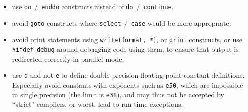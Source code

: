\begin{itemize}
\item use \texttt{do}~/~\texttt{enddo} constructs instead of
      \texttt{do}~/~\texttt{continue}.

\item avoid \texttt{goto} constructs where \texttt{select}~/~\texttt{case}
      would be more appropriate.

\item avoid print statements using \texttt{write(format, *)},
      or \texttt{print} constructs, or use \texttt{\#ifdef debug}
      around debugging code using them, to ensure that output is redirected
      correctly in parallel mode.

\item use \texttt{d} and not \texttt{e} to define double-precision
      floating-point constant definitions. Especially avoid
      constants with exponents such as \texttt{e50}, which are impossible
      in single precision (the limit is \texttt{e38}), and may thus not
      be accepted by ``strict'' compilers, or worst, lead to run-time
      exceptions.

\end{itemize}


